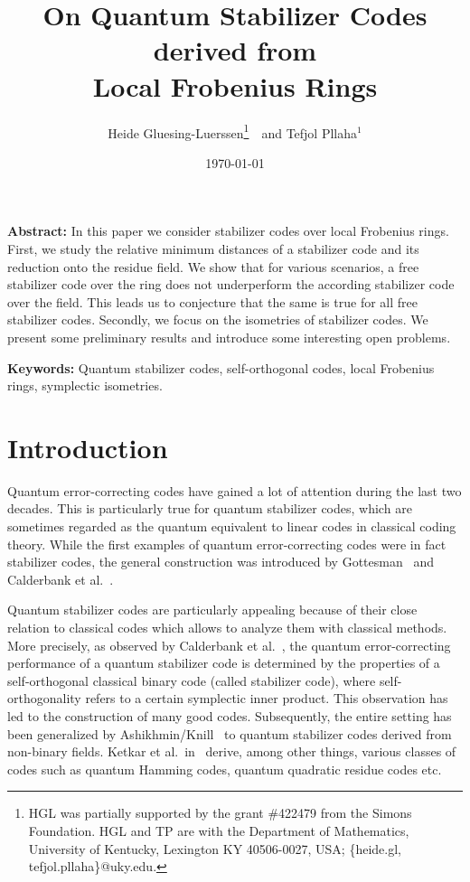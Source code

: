 \documentclass[11pt]{article}
\theoremstyle{definition}
\numberwithin{equation}{section}
\newcounter{rom}
\begin{document}
\title{On Quantum Stabilizer Codes derived from\\ Local Frobenius Rings}
\date{\today}
\author{Heide Gluesing-Luerssen\thanks{HGL was partially supported by the grant \#422479 from the Simons Foundation.
  HGL and TP are with the Department of Mathematics, University of Kentucky, Lexington KY 40506-0027, USA;
\{heide.gl, tefjol.pllaha\}@uky.edu.}\ \ and Tefjol Pllaha$^1$}

\maketitle

{\bf Abstract:}
 In this paper we consider stabilizer codes over local Frobenius rings.
 First, we study the relative minimum distances of a stabilizer code and its reduction onto the residue field.
 We show that for various scenarios, a free stabilizer code over the ring does not underperform the according stabilizer code over the  field.
This leads us to conjecture that the same is true for all free stabilizer codes.
 Secondly, we focus on the isometries of stabilizer codes.
 We present some preliminary results and introduce some interesting open problems.

{\bf Keywords:} Quantum stabilizer codes, self-orthogonal codes, local Frobenius rings, symplectic isometries.

\section{Introduction}
Quantum error-correcting codes have gained a lot of attention during the last two decades.
This is particularly true for quantum stabilizer codes, which are sometimes regarded as the quantum equivalent to linear codes in classical coding theory.
While the first examples of quantum error-correcting codes were in fact stabilizer codes,
the general construction was introduced by Gottesman~\cite{Go96} and Calderbank et al.~\cite{CRSS97}.

Quantum stabilizer codes are particularly appealing because of their close relation to classical codes which allows to analyze them with classical methods.
More precisely, as observed by Calderbank et al.~\cite{CRSS98}, the quantum  error-correcting performance of a quantum stabilizer code is determined by the properties
of a self-orthogonal classical binary code (called stabilizer code), where self-orthogonality refers to a certain symplectic inner product.
This observation has led to the construction of many good codes.
Subsequently, the entire setting has been generalized by Ashikhmin/Knill~\cite{AsKn01} to quantum stabilizer codes derived from non-binary fields.
Ketkar et al.\ in~\cite{KKKS06} derive, among other things, various classes of
codes such as quantum Hamming codes, quantum quadratic residue codes etc.
\end{document}
